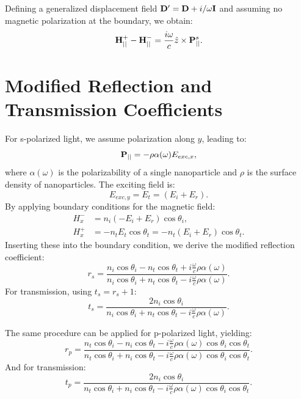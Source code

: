 \documentclass{article}
\begin{document}
	Defining a generalized displacement field $\vb{D}' = \vb{D} + i/\omega \vb{I}$ and assuming no magnetic polarization at the boundary, we obtain:
	\begin{equation}
		\vb{H}_{||}^{+} - \vb{H}_{||}^{-} = \frac{i \omega}{c} \hat{z} \times \vb{P}_{||}^s.
	\end{equation}
	
	\section{Modified Reflection and Transmission Coefficients}
	For s-polarized light, we assume polarization along $y$, leading to:
	\begin{equation}
		\vb{P}_{||} = -\rho \alpha(\omega) E_{exc, x},
	\end{equation}
	where $\alpha(\omega)$ is the polarizability of a single nanoparticle and $\rho$ is the surface density of nanoparticles. The exciting field is:
	\begin{equation}
		E_{exc, y} = E_t = (E_i + E_r).
	\end{equation}
	By applying boundary conditions for the magnetic field:
	\begin{align}
		H_{x}^{-} &= n_i (-E_i + E_r) \cos \theta_i, \\
		H_{x}^{+} &= -n_t E_t \cos \theta_t = -n_t (E_i + E_r) \cos \theta_t.
	\end{align}
	Inserting these into the boundary condition, we derive the modified reflection coefficient:
	\begin{equation}
		r_s = \frac{n_i \cos \theta_i - n_t \cos \theta_t + i \frac{\omega}{c} \rho \alpha(\omega)}{n_i \cos \theta_i + n_t \cos \theta_t - i \frac{\omega}{c} \rho \alpha(\omega)}.
	\end{equation}
	For transmission, using $t_s = r_s + 1$:
	\begin{equation}
		t_s = \frac{2 n_i \cos \theta_i}{n_i \cos \theta_i + n_t \cos \theta_t - i \frac{\omega}{c} \rho \alpha(\omega)}.
	\end{equation}
	
	The same procedure can be applied for p-polarized light, yielding:
	\begin{equation}
		r_p = \frac{n_t \cos \theta_i - n_i \cos \theta_t - i \frac{\omega}{c} \rho \alpha(\omega) \cos \theta_i \cos \theta_t}{n_t \cos \theta_i + n_i \cos \theta_t - i \frac{\omega}{c} \rho \alpha(\omega) \cos \theta_i \cos \theta_t}.
	\end{equation}
	And for transmission:
	\begin{equation}
		t_p = \frac{2 n_i \cos \theta_i}{n_t \cos \theta_i + n_i \cos \theta_t - i \frac{\omega}{c} \rho \alpha(\omega) \cos \theta_i \cos \theta_t}.
	\end{equation}
	
\end{document}
